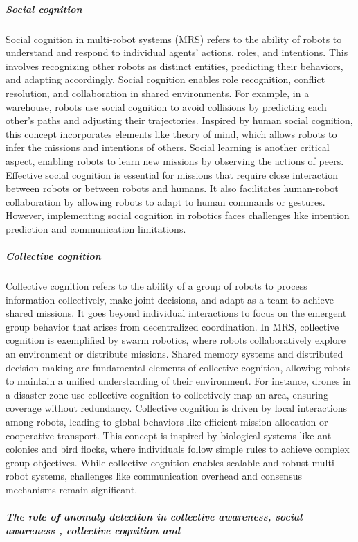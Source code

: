 \documentclass{book}
\begin{document}
\subparagraph{Social cognition}
Social cognition in multi-robot systems (MRS) refers to the ability of robots to understand and respond to individual agents’ actions, roles, and intentions. This involves recognizing other robots as distinct entities, predicting their behaviors, and adapting accordingly. Social cognition enables role recognition, conflict resolution, and collaboration in shared environments. For example, in a warehouse, robots use social cognition to avoid collisions by predicting each other’s paths and adjusting their trajectories. Inspired by human social cognition, this concept incorporates elements like theory of mind, which allows robots to infer the missions and intentions of others. Social learning is another critical aspect, enabling robots to learn new missions by observing the actions of peers. Effective social cognition is essential for missions that require close interaction between robots or between robots and humans. It also facilitates human-robot collaboration by allowing robots to adapt to human commands or gestures. However, implementing social cognition in robotics faces challenges like intention prediction and communication limitations.


\subparagraph{Collective cognition}
Collective cognition refers to the ability of a group of robots to process information collectively, make joint decisions, and adapt as a team to achieve shared missions. It goes beyond individual interactions to focus on the emergent group behavior that arises from decentralized coordination. In MRS, collective cognition is exemplified by swarm robotics, where robots collaboratively explore an environment or distribute missions. Shared memory systems and distributed decision-making are fundamental elements of collective cognition, allowing robots to maintain a unified understanding of their environment. For instance, drones in a disaster zone use collective cognition to collectively map an area, ensuring coverage without redundancy. Collective cognition is driven by local interactions among robots, leading to global behaviors like efficient mission allocation or cooperative transport. This concept is inspired by biological systems like ant colonies and bird flocks, where individuals follow simple rules to achieve complex group objectives. While collective cognition enables scalable and robust multi-robot systems, challenges like communication overhead and consensus mechanisms remain significant.


\subparagraph{The role of anomaly detection in collective awareness, social awareness , collective cognition and }
\end{document}
